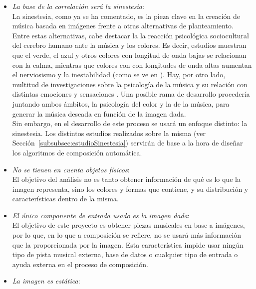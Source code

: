 		\begin{itemize}
		
		\item \emph{La base de la correlación será la sinestesia}:
			\vspace{0.1in}
			\\La sinestesia, como ya se ha comentado, es la pieza clave en la creación de música basada en imágenes frente a otras alternativas de planteamiento.\\
			Entre estas alternativas, cabe destacar la la reacción psicológica sociocultural del cerebro humano ante la música y los colores. Es decir, estudios muestran que el verde, el azul y otros colores con longitud de onda bajas se relacionan con la calma, mientras que colores con con longitudes de onda altas aumentan el nerviosismo y la inestabilidad (como se ve en \cite{colorpsy}). Hay, por otro lado, multitud de investigaciones sobre la psicología de la música y su relación con distintas emociones y sensaciones . Una posible rama de desarrollo procedería juntando ambos ámbitos, la psicología del color y la de la música, para generar la música deseada en función de la imagen dada.\\
			Sin embargo, en el desarrollo de este proceso se usará un enfoque distinto: la sinestesia. Los distintos estudios realizados sobre la misma (ver Sección~\ref{subsubsec:estudioSinestesia}) servirán de base a la hora de diseñar los algoritmos de composición automática.
		\item \emph{No se tienen en cuenta objetos físicos}:
			\vspace{0.1in}
			\\El objetivo del análisis no es tanto obtener información de qué es lo que la imagen representa, sino los colores y formas que contiene, y su distribución y características dentro de la misma.
		\item \emph{El único componente de entrada usado es la imagen dada}:
			\vspace{0.1in}
			\\El objetivo de este proyecto es obtener piezas musicales en base a imágenes, por lo que, en lo que a composición se refiere, no se usará más información que la proporcionada por la imagen. Esta característica impide usar ningún tipo de pista musical externa, base de datos o cualquier tipo de entrada o ayuda externa en el proceso de composición.
		\item \emph{La imagen es estática}:
			\vspace{0.1in}

\end{itemize}
